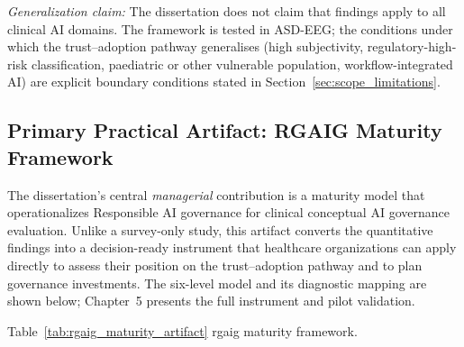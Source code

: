 \noindent\emph{Generalization claim:} The dissertation does not claim that findings apply to all clinical AI domains. The framework is tested in ASD-EEG; the conditions under which the trust--adoption pathway generalises (high subjectivity, regulatory-high-risk classification, paediatric or other vulnerable population, workflow-integrated AI) are explicit boundary conditions stated in Section~\ref{sec:scope_limitations}.

\subsection*{Primary Practical Artifact: RGAIG Maturity Framework}
\label{sec:rgaig_maturity_artifact}

\noindent The dissertation's central \emph{managerial} contribution is a maturity model that operationalizes Responsible AI governance for clinical conceptual AI governance evaluation. Unlike a survey-only study, this artifact converts the quantitative findings into a decision-ready instrument that healthcare organizations can apply directly to assess their position on the trust--adoption pathway and to plan governance investments. The six-level model and its diagnostic mapping are shown below; Chapter~5 presents the full instrument and pilot validation.

\noindent Table~\ref{tab:rgaig_maturity_artifact} rgaig maturity framework.

